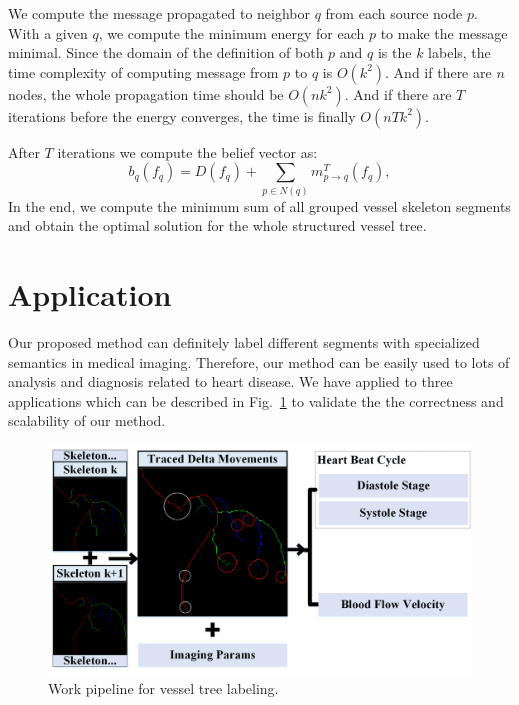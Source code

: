 \documentclass[journal]{IEEEtran}
\begin{document}
We compute the message propagated to neighbor $q$ from each source node $p$. With a given $q$, we compute the minimum energy for each $p$ to make the message minimal. Since the domain of the definition of both $p$ and $q$ is the $k$ labels, the time complexity of computing message from $p$ to $q$ is $O(k^2)$. And if there are $n$ nodes, the whole propagation time should be $O(nk^2)$. And if there are 
$T$ iterations before the energy converges, the time is finally $O(nTk^2)$.  

After $T$ iterations we compute the belief vector as:
\begin{equation}
b_{q}(f_{q}) = D(f_{q}) + \sum_{p \in N(q)}{m_{p \to q}^{T}(f_{q})}, 
\end{equation}
In the end, we compute the minimum sum of all grouped vessel skeleton segments and obtain the optimal solution for the whole structured vessel tree. 


\section{Application}
Our proposed method can definitely label different segments with specialized semantics in medical imaging. Therefore, our method can be easily used to lots of analysis and diagnosis related to heart disease. We have applied to three applications which can be described in Fig.~\ref{fig:application-pipline} to validate the the correctness and scalability of our method. 

\begin{figure}[!t]
\centering
\includegraphics[width=1.0\linewidth]{./images/application-pipeline.png}
\caption{Work pipeline for vessel tree labeling.}
\label{fig:application-pipline}
\end{figure}
\end{document}
